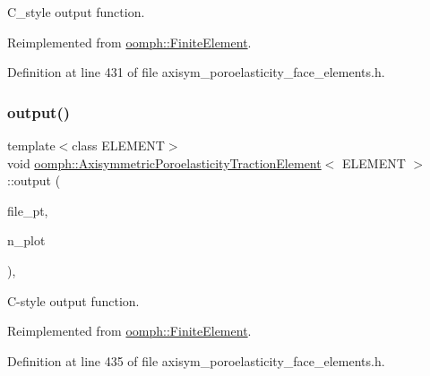 C\+\_\+style output function. 



Reimplemented from \hyperlink{classoomph_1_1FiniteElement_a72cddd09f8ddbee1a20a1ff404c6943e}{oomph\+::\+Finite\+Element}.



Definition at line 431 of file axisym\+\_\+poroelasticity\+\_\+face\+\_\+elements.\+h.

\mbox{\label{classoomph_1_1AxisymmetricPoroelasticityTractionElement_ac2efa0fcd5c5d4fe2a0772a181c81f97}} 
\subsubsection{\texorpdfstring{output()}{output()}\hspace{0.1cm}{\footnotesize\ttfamily [4/4]}}
{\footnotesize\ttfamily template$<$class E\+L\+E\+M\+E\+NT$>$ \\
void \hyperlink{classoomph_1_1AxisymmetricPoroelasticityTractionElement}{oomph\+::\+Axisymmetric\+Poroelasticity\+Traction\+Element}$<$ E\+L\+E\+M\+E\+NT $>$\+::output (\begin{DoxyParamCaption}\item[{F\+I\+LE $\ast$}]{file\+\_\+pt,  }\item[{const unsigned \&}]{n\+\_\+plot }\end{DoxyParamCaption})\hspace{0.3cm}{\ttfamily [inline]}, {\ttfamily [virtual]}}



C-\/style output function. 



Reimplemented from \hyperlink{classoomph_1_1FiniteElement_adfaee690bb0608f03320eeb9d110d48c}{oomph\+::\+Finite\+Element}.



Definition at line 435 of file axisym\+\_\+poroelasticity\+\_\+face\+\_\+elements.\+h.

\mbox{\label{classoomph_1_1AxisymmetricPoroelasticityTractionElement_a9d0a69336be18e1a62450c5c8872777b}} 
